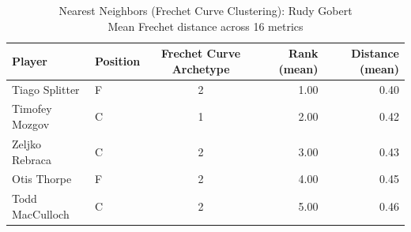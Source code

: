 \begin{table}[t]
\caption*{
{\fontsize{20}{25} Nearest Neighbors (Frechet Curve Clustering): Rudy Gobert\fontsize{12}{15}\selectfont } \\ 
{\fontsize{14}{17}\selectfont  Mean Frechet distance across 16 metrics\fontsize{12}{15}\selectfont }
} 
\fontsize{12.0pt}{14.0pt}\selectfont
\begin{tabular*}{\linewidth}{@{\extracolsep{\fill}}llcrr}
\toprule
Player & Position & Frechet Curve Archetype & Rank (mean) & Distance (mean) \\ 
\midrule\addlinespace[2.5pt]
Tiago Splitter & F & 2 & 1.00 & 0.40 \\ 
Timofey Mozgov & C & 1 & 2.00 & 0.42 \\ 
Zeljko Rebraca & C & 2 & 3.00 & 0.43 \\ 
Otis Thorpe & F & 2 & 4.00 & 0.45 \\ 
Todd MacCulloch & C & 2 & 5.00 & 0.46 \\ 
\bottomrule
\end{tabular*}
\end{table}

